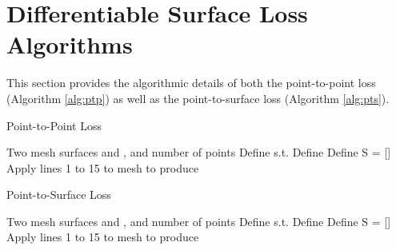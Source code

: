\documentclass{article}
\begin{document}
\section{Differentiable Surface Loss Algorithms}

This section provides the algorithmic details of both the point-to-point loss (Algorithm \ref{alg:ptp}) as well as the point-to-surface loss (Algorithm \ref{alg:pts}).


\begin{algorithm}[tbh]
   \caption{Point-to-Point Loss}
   \label{alg:ptp}
\begin{algorithmic}[1]
     Two mesh surfaces  and , and number of points 
    \STATE 
    \STATE 
    \ENDFOR
    \STATE Define  s.t. 
    \STATE Define 
    \STATE Define S = [] 
    \STATE 
    \STATE 
    \STATE 
    \STATE 
    \STATE 
    \ENDFOR
    \STATE Apply lines 1 to 15 to mesh  to produce 
    \STATE 
\end{algorithmic}
\end{algorithm}



\begin{algorithm}[tbh]
   \caption{Point-to-Surface Loss}
   \label{alg:pts}
\begin{algorithmic}[1]
     Two mesh surfaces  and , and number of points 
    \STATE 
    \STATE 
    \ENDFOR
    \STATE Define  s.t. 
    \STATE Define 
    \STATE Define S = [] 
    \STATE 
    \STATE 
    \STATE 
    \STATE 
    \STATE 
    \ENDFOR
    \STATE Apply lines 1 to 15 to mesh  to produce 
    \STATE 
\end{algorithmic}
\end{algorithm}
\end{document}
